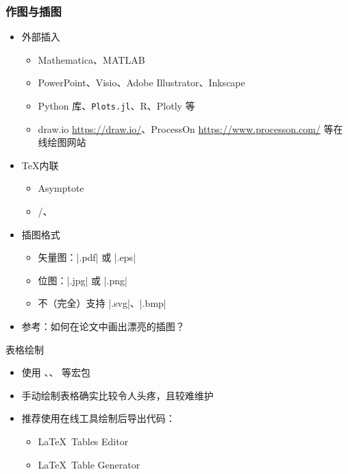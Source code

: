       \begin{frame}[fragile]
        \frametitle{作图与插图}
        \begin{itemize}
          \item 外部插入
      
            \begin{itemize}
              \item Mathematica、MATLAB
              \item PowerPoint、Visio、Adobe Illustrator、Inkscape
              \item Python  库、\texttt{Plots.jl}、R、Plotly 等
              \item draw.io \url{https://draw.io/}、ProcessOn \url{https://www.processon.com/} 等在线绘图网站
            \end{itemize}
      
          \item \TeX 内联
      
            \begin{itemize}
              \item Asymptote
              \item \alert{/、}
            \end{itemize}
      
          \item 插图格式
      
            \begin{itemize}
              \item 矢量图：|.pdf| 或 |.eps|
              \item 位图：|.jpg| 或 |.png|
              \item 不（完全）支持 |.svg|、|.bmp|
            \end{itemize}
      
          \item 参考：如何在论文中画出漂亮的插图？
        \end{itemize}
      \end{frame}
      
      \begin{frame}[fragile]{表格绘制}
        \begin{itemize}
          \item 使用 、、 等宏包
          \item 手动绘制表格确实比较令人头疼，且较难维护
          \item 推荐使用在线工具绘制后导出代码：
            \begin{itemize}
              \item \LaTeX \ Tables Editor 
              \item \LaTeX \ Table Generator 
            \end{itemize}
        \end{itemize}
      \end{frame}
      
